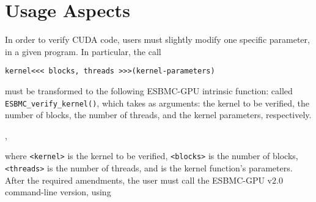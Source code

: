 \documentclass{llncs}
\begin{document}
\section{Usage Aspects}
\label{subsec:usage}

In order to verify CUDA code, users must slightly modify one specific parameter, in a given program. In particular, the call %

\begin{center}
\vspace{1 mm}
{\tt kernel<<< blocks, threads >>>(kernel-parameters)}
\vspace{1 mm}
\end{center}

\noindent must be transformed to the following ESBMC-GPU intrinsic function: called {\tt ESBMC\_verify\_kernel()}, which takes as arguments: the kernel to be verified, the number of blocks, the number of threads, and the kernel parameters, respectively.

\begin{center}
\vspace{1 mm}

,
\vspace{1 mm}
\end{center}

\noindent where {\tt <kernel>} is the kernel to be verified, {\tt <blocks>} is the number of blocks, {\tt <threads>} is the number of threads, and {\tt <kernel-parameters>} is the kernel function's parameters. After the required amendments, the user must call the ESBMC-GPU v$2.0$ command-line version, using
\end{document}
